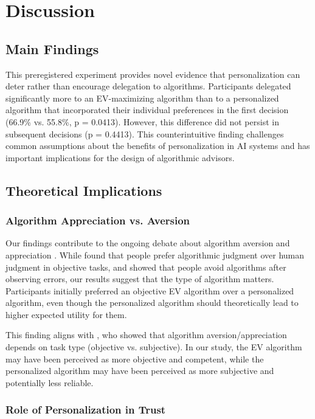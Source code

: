 \section{Discussion}

\subsection{Main Findings}

This preregistered experiment provides novel evidence that personalization can deter rather than encourage delegation to algorithms. Participants delegated significantly more to an EV-maximizing algorithm than to a personalized algorithm that incorporated their individual preferences in the first decision (66.9\% vs. 55.8\%, p = 0.0413). However, this difference did not persist in subsequent decisions (p = 0.4413). This counterintuitive finding challenges common assumptions about the benefits of personalization in AI systems and has important implications for the design of algorithmic advisors.

\subsection{Theoretical Implications}

\subsubsection{Algorithm Appreciation vs. Aversion}

Our findings contribute to the ongoing debate about algorithm aversion and appreciation \citep{dietvorst2015, logg2019}. While \citet{logg2019} found that people prefer algorithmic judgment over human judgment in objective tasks, and \citet{dietvorst2015} showed that people avoid algorithms after observing errors, our results suggest that the type of algorithm matters. Participants initially preferred an objective EV algorithm over a personalized algorithm, even though the personalized algorithm should theoretically lead to higher expected utility for them.

This finding aligns with \citet{castelo2019}, who showed that algorithm aversion/appreciation depends on task type (objective vs. subjective). In our study, the EV algorithm may have been perceived as more objective and competent, while the personalized algorithm may have been perceived as more subjective and potentially less reliable.

\subsubsection{Role of Personalization in Trust}

